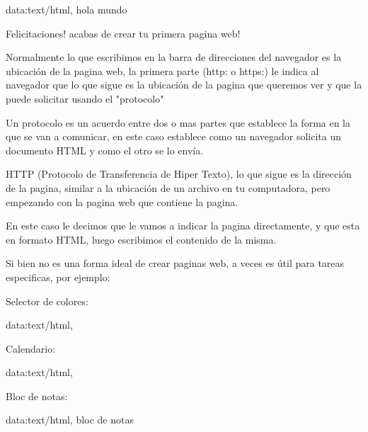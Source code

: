 \documentclass[letterpaper,10pt,spanish]{sphinxmanual}
\begin{document}
%
\begin{sphinxVerbatim}[commandchars=\\\{\}]
data:text/html, hola mundo
\end{sphinxVerbatim}

Felicitaciones! acabas de crear tu primera pagina web!

Normalmente lo que escribimos en la barra de direcciones del navegador es la
ubicación de la pagina web, la primera parte (http: o https:) le indica al
navegador que lo que sigue es la ubicación de la pagina que queremos ver y que
la puede solicitar usando el "protocolo" %
\begin{footnote}[1]\sphinxAtStartFootnote
Un protocolo es un acuerdo entre dos o mas partes que establece la forma en la que se van a comunicar, en este caso establece como un navegador solicita un documento HTML y como el otro se lo envía.
%
\end{footnote} HTTP (Protocolo de Transferencia
de Hiper Texto), lo que sigue es la dirección de la pagina, similar a la
ubicación de un archivo en tu computadora, pero empezando con la pagina web que
contiene la pagina.

En este caso le decimos que le vamos a indicar la pagina directamente, y que
esta en formato HTML, luego escribimos el contenido de la misma.

Si bien no es una forma ideal de crear paginas web, a veces es útil para tareas
especificas, por ejemplo:

Selector de colores:

%
\begin{sphinxVerbatim}[commandchars=\\\{\}]
data:text/html,  
\end{sphinxVerbatim}

Calendario:

%
\begin{sphinxVerbatim}[commandchars=\\\{\}]
data:text/html,  
\end{sphinxVerbatim}

Bloc de notas:

%
\begin{sphinxVerbatim}[commandchars=\\\{\}]
data:text/html,   bloc de notas
\end{sphinxVerbatim}
\end{document}
